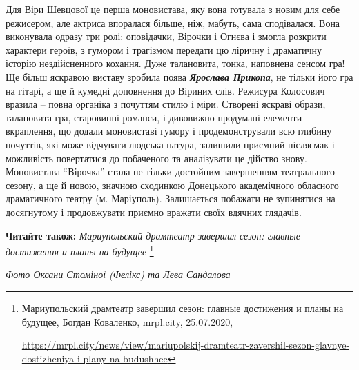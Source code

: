
Для Віри Шевцової це перша моновистава, яку вона готувала з новим для себе
режисером, але актриса впоралася більше, ніж, мабуть, сама сподівалася. Вона
виконувала одразу три ролі: оповідачки, Вірочки і Огнєва і змогла розкрити
характери героїв, з гумором і трагізмом передати цю ліричну і драматичну
історію нездійсненного кохання. Дуже талановита, тонка, наповнена сенсом гра!
Ще більш яскравою виставу зробила поява \emph{\textbf{Ярослава Прикопа}}, не тільки його гра на
гітарі, а ще й кумедні доповнення до Віриних слів. Режисура Колосович вразила –
повна органіка з почуттям стилю і міри. Створені яскраві образи, талановита
гра, старовинні романси, і дивовижно продумані елементи-вкраплення, що додали
моновиставі гумору і продемонстрували всю глибину почуттів, які може відчувати
людська натура, залишили приємний післясмак і можливість повертатися до
побаченого та аналізувати це дійство знову. Моновистава \enquote{Вірочка} стала не
тільки достойним завершенням театрального сезону, а ще й новою, значною
сходинкою Донецького академічного обласного драматичного театру (м. Маріуполь).
Залишається побажати не зупинятися на досягнутому і продовжувати приємно
вражати своїх вдячних глядачів.

\textbf{Читайте також:} \emph{Мариупольский драмтеатр завершил сезон: главные достижения и планы на будущее}%
\footnote{Мариупольский драмтеатр завершил сезон: главные достижения и планы на будущее, Богдан Коваленко, mrpl.city, 25.07.2020, \par%
\url{https://mrpl.city/news/view/mariupolskij-dramteatr-zavershil-sezon-glavnye-dostizheniya-i-plany-na-budushhee}
}

\emph{Фото Оксани Стоміної (Фелікс) та Лева Сандалова}

